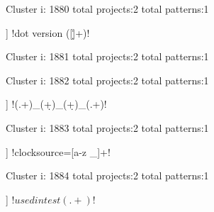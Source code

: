 Cluster i: 1880
total projects:2
total patterns:1
\begin{multicols}{1}
\begin{description}[noitemsep,topsep=0pt]
\item [[2] ] \cverb!dot version ([\d\.]+)!
\end{description}
\end{multicols}







Cluster i: 1881
total projects:2
total patterns:1
\begin{multicols}{1}
\end{multicols}







Cluster i: 1882
total projects:2
total patterns:1
\begin{multicols}{1}
\begin{description}[noitemsep,topsep=0pt]
\item [[2] ] \cverb!(.+)_(\d+)_(\d+)_(.+)!
\end{description}
\end{multicols}







Cluster i: 1883
total projects:2
total patterns:1
\begin{multicols}{1}
\begin{description}[noitemsep,topsep=0pt]
\item [[2] ] \cverb!clocksource=[a-z \-_]+!
\end{description}
\end{multicols}







Cluster i: 1884
total projects:2
total patterns:1
\begin{multicols}{1}
\begin{description}[noitemsep,topsep=0pt]
\item [[2] ] \cverb!\(used in test (.+)\)!
\end{description}
\end{multicols}







